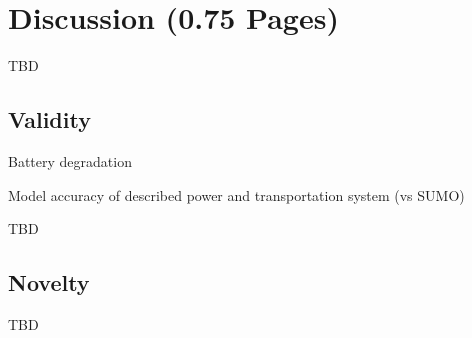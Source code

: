 \section{Discussion (0.75 Pages)}
\label{section:discussion}

TBD

\subsection{Validity}

Battery degradation

Model accuracy of described power and transportation system (vs SUMO)

TBD

\subsection{Novelty}

TBD